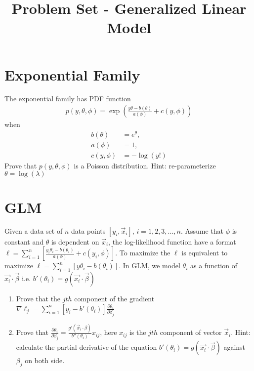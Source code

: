\documentclass{article}
\title{Problem Set - Generalized Linear Model} %
\begin{document}
\maketitle %
\thispagestyle{fancy}
\pagestyle{fancy}

\section{Exponential Family}
The exponential family has PDF function 
\begin{align*}
p(y, \theta, \phi)=\exp\left(\frac{y\theta-b(\theta)}{a(\phi)}+c(y, \phi)\right)
\end{align*}
when 
\begin{align*}
b(\theta)&=e^\theta, \\
a(\phi)&=1, \\
c(y, \phi)&=-\log(y!)
\end{align*}
Prove that $p(y, \theta, \phi)$ is a Poisson distribution. Hint: re-parameterize $\theta=\log(\lambda)$

\section{GLM}
Given a data set of $n$ data points $[y_i, \vec{x}_i]$, $i=1, 2, 3, ..., n$. Assume that $\phi$ is constant and $\theta$ is dependent on $\vec{x}_i$, the log-likelihood function have a format $\ell=\sum\limits_{i=1}^n [\frac{y_i\theta_i-b(\theta_i)}{a(\phi)}+c(y_i, \phi)]$. To maximize the $\ell$ is equivalent to maximize 
$\ell=\sum\limits_{i=1}^n [y\theta_i-b(\theta_i)]$. In GLM, we model $\theta_i$ as a function of $\vec{x_i}\cdot\vec{\beta}$ i.e. $b'(\theta_i)=g(\vec{x_i}\cdot\vec{\beta})$
\begin{enumerate}
\item Prove that the $jth$ component of the gradient  $\nabla\ell_j=\sum\limits_{i=1}^n[y_i-b'(\theta_i)]\frac{\partial\theta_i}{\partial\beta_j}$
\item Prove that $\frac{\partial \theta_i}{\partial \beta_j}=\frac{g'(\vec{x}_i\cdot\beta)}{b''(\theta_i)}x_{ij}$, here $x_{ij}$ is the $jth$ component of vector $\vec{x}_i$. Hint: calculate the partial derivative of the equation $b'(\theta_i)=g(\vec{x_i}\cdot\vec{\beta})$ against $\beta_j$ on both side.
\end{enumerate}
\end{document}
